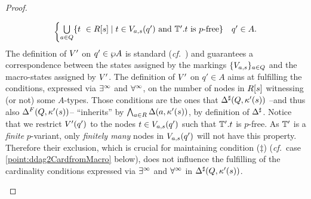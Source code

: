 \begin{proof}
\begin{enumerate}[label = (\Alph*), ref = \Alph*]
\begin{enumerate}[label = (\roman*), ref = \roman*]
\begin{align*}
\begin{cases}
               \bigcup\limits_{a \in Q} \{t\ \in \R{s} \mid t \in \val_{a,s}(q') \text{ and }\bbT'.t\text{ is $p$-free}\}              & q' \in A.
           \end{cases}
       \end{align*}
       The definition of $V'$ on $q' \in \wp A$ is standard (\emph{cf.}~\cite[Prop. 2.21]{Zanasi:Thesis:2012}) and guarantees a correspondence between the states assigned by the markings $\{V_{a,s}\}_{a \in Q}$ and the macro-states assigned by $V'$. The definition of $V'$ on $q' \in A$ aims at fulfilling the conditions, expressed via $\exists^\infty$ and $\forall^\infty$, on the number of nodes in $R[s]$ witnessing (or not) some $A$-types. Those conditions are the ones that $\Delta^{\sharp}(Q,\kappa'(s))$ --and thus also $\Delta^{F}(Q,\kappa'(s))$-- ``inherits'' by $\bigwedge_{a \in R} \Delta(a,\kappa'(s))$, by definition of $\Delta^{\sharp}$. Notice that we restrict $V'(q')$ to the nodes $t \in V_{a,s}(q')$ such that $\mathbb{T}'.t$ is $p$-free. As $\mathbb{T}'$ is a \emph{finite} $p$-variant, only \emph{finitely many} nodes in $V_{a,s}(q')$ will not have this property. Therefore their exclusion, which is crucial for maintaining condition ($\ddag$) (\emph{cf.}~case \eqref{point:ddag2CardfromMacro} below), does not influence the fulfilling of the cardinality conditions expressed via $\exists^\infty$ and $\forall^\infty$ in $\Delta^{\sharp}(Q,\kappa'(s))$.


\end{enumerate}
\end{enumerate}
\end{proof}
